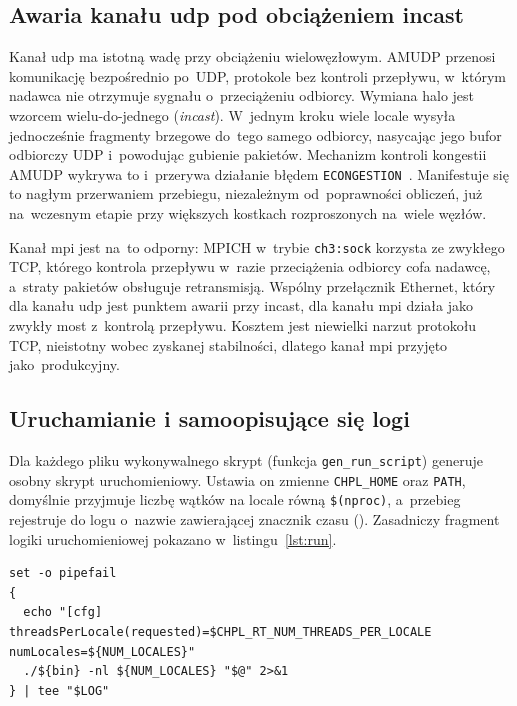\subsection{Awaria kanału udp pod obciążeniem incast}

Kanał udp ma istotną wadę przy obciążeniu wielowęzłowym. AMUDP przenosi
komunikację bezpośrednio po~UDP, protokole bez kontroli przepływu, w~którym nadawca
nie otrzymuje sygnału o~przeciążeniu odbiorcy. Wymiana halo jest wzorcem
wielu-do-jednego (\emph{incast}). W~jednym kroku wiele locale wysyła jednocześnie
fragmenty brzegowe do~tego samego odbiorcy, nasycając jego bufor odbiorczy UDP
i~powodując gubienie pakietów. Mechanizm kontroli kongestii AMUDP wykrywa to
i~przerywa działanie błędem \texttt{ECONGESTION}~\cite{incast}. Manifestuje się
to nagłym przerwaniem przebiegu, niezależnym od~poprawności obliczeń, już
na~wczesnym etapie przy większych kostkach rozproszonych na~wiele węzłów.

Kanał mpi jest na~to odporny: MPICH w~trybie \texttt{ch3:sock} korzysta ze
zwykłego TCP, którego kontrola przepływu w~razie przeciążenia odbiorcy cofa
nadawcę, a~straty pakietów obsługuje retransmisją. Wspólny przełącznik Ethernet,
który dla kanału udp jest punktem awarii przy incast, dla kanału mpi działa jako
zwykły most z~kontrolą przepływu. Kosztem jest niewielki narzut protokołu TCP,
nieistotny wobec zyskanej stabilności, dlatego kanał mpi przyjęto jako~produkcyjny.

\subsection{Uruchamianie i samoopisujące się logi}

Dla każdego pliku wykonywalnego skrypt  (funkcja \texttt{gen\_run\_script}) generuje osobny skrypt uruchomieniowy. Ustawia on zmienne \texttt{CHPL\_HOME} oraz \texttt{PATH}, domyślnie przyjmuje liczbę wątków na locale równą \texttt{\$(nproc)}, a~przebieg rejestruje do logu o~nazwie zawierającej znacznik czasu (). Zasadniczy fragment logiki uruchomieniowej pokazano w~listingu~\ref{lst:run}.

\begin{lstlisting}[style=bash, caption={Blok uruchomieniowo-rejestrujący ze skryptu wrappera.}, label={lst:run}]
set -o pipefail
{
  echo "[cfg] threadsPerLocale(requested)=$CHPL_RT_NUM_THREADS_PER_LOCALE numLocales=${NUM_LOCALES}"
  ./${bin} -nl ${NUM_LOCALES} "$@" 2>&1
} | tee "$LOG"
\end{lstlisting}

